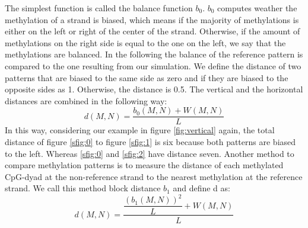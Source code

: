 The simplest function is called the balance function $b_0$. $b_0$ computes weather the methylation of a strand is biased, which means if the majority of methylations is either on the left or right of the center of the strand. Otherwise, if the amount of methylations on the right side is equal to the one on the left, we say that the methylations are balanced. In the following the balance of the reference pattern is compared to the one resulting from our simulation. We define the distance of two patterns that are biased to the same side as zero and if they are biased to the opposite sides as 1. Otherwise, the distance is 0.5. The vertical and the horizontal distances are combined in the following way:
\[d(M,N) = \dfrac{b_0(M,N) + W(M,N)}{L}\]
In this way, considering our example in figure \ref{fig:vertical} again, the total distance of figure \ref{sfig:0} to figure \ref{sfig:1} is six because both patterns are biased to the left. Whereas \ref{sfig:0} and \ref{sfig:2} have distance seven.\newline
Another method to compare methylation patterns is to measure the distance of each methylated \ac{CpG}-dyad at the non-reference strand to the nearest methylation at the reference strand. We call this method block distance $b_1$ and define d as:
\[d(M,N) = \dfrac{\dfrac{(b_1(M,N))^2}{L} + W(M,N)}{L}\]
